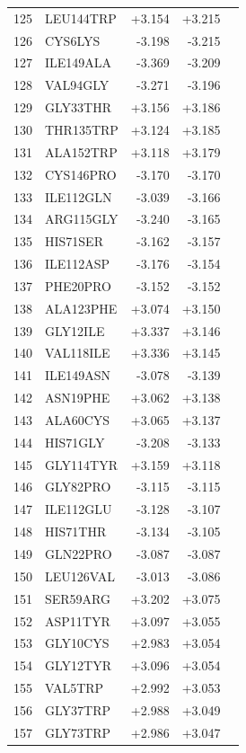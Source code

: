 \begin{longtable}{r l r r c}
125 & LEU144TRP & +3.154 & +3.215 &  \\
126 & CYS6LYS & -3.198 & -3.215 &  \\
127 & ILE149ALA & -3.369 & -3.209 &  \\
128 & VAL94GLY & -3.271 & -3.196 &  \\
129 & GLY33THR & +3.156 & +3.186 &  \\
130 & THR135TRP & +3.124 & +3.185 &  \\
131 & ALA152TRP & +3.118 & +3.179 &  \\
132 & CYS146PRO & -3.170 & -3.170 &  \\
133 & ILE112GLN & -3.039 & -3.166 &  \\
134 & ARG115GLY & -3.240 & -3.165 &  \\
135 & HIS71SER & -3.162 & -3.157 &  \\
136 & ILE112ASP & -3.176 & -3.154 &  \\
137 & PHE20PRO & -3.152 & -3.152 &  \\
138 & ALA123PHE & +3.074 & +3.150 &  \\
139 & GLY12ILE & +3.337 & +3.146 &  \\
140 & VAL118ILE & +3.336 & +3.145 &  \\
141 & ILE149ASN & -3.078 & -3.139 &  \\
142 & ASN19PHE & +3.062 & +3.138 &  \\
143 & ALA60CYS & +3.065 & +3.137 &  \\
144 & HIS71GLY & -3.208 & -3.133 &  \\
145 & GLY114TYR & +3.159 & +3.118 &  \\
146 & GLY82PRO & -3.115 & -3.115 &  \\
147 & ILE112GLU & -3.128 & -3.107 &  \\
148 & HIS71THR & -3.134 & -3.105 &  \\
149 & GLN22PRO & -3.087 & -3.087 &  \\
150 & LEU126VAL & -3.013 & -3.086 &  \\
151 & SER59ARG & +3.202 & +3.075 &  \\
152 & ASP11TYR & +3.097 & +3.055 &  \\
153 & GLY10CYS & +2.983 & +3.054 &  \\
154 & GLY12TYR & +3.096 & +3.054 &  \\
155 & VAL5TRP & +2.992 & +3.053 &  \\
156 & GLY37TRP & +2.988 & +3.049 &  \\
157 & GLY73TRP & +2.986 & +3.047 &  \\

\end{longtable}
